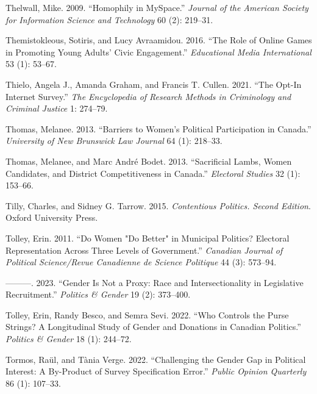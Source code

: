 \documentclass[
  letterpaper,
  DIV=11,
  numbers=noendperiod]{scrreprt}
\newlength{\cslhangindent}
\newlength{\cslentryspacingunit} %
\newenvironment{CSLReferences}[2] %
 {%
  \setlength{\parindent}{0pt}
  \ifodd #1
  \let\oldpar\par
  \def\par{\hangindent=\cslhangindent\oldpar}
  \fi
  \setlength{\parskip}{#2\cslentryspacingunit}
 }%
 {}
\begin{document}
\begin{CSLReferences}{1}{0}
\leavevmode{}%
Thelwall, Mike. 2009. {``{Homophily in MySpace}.''} \emph{Journal of the
American Society for Information Science and Technology} 60 (2):
219--31.

\leavevmode{}%
Themistokleous, Sotiris, and Lucy Avraamidou. 2016. {``{The Role of
Online Games in Promoting Young Adults' Civic Engagement}.''}
\emph{Educational Media International} 53 (1): 53--67.

\leavevmode{}%
Thielo, Angela J., Amanda Graham, and Francis T. Cullen. 2021. {``{The
Opt-In Internet Survey}.''} \emph{The Encyclopedia of Research Methods
in Criminology and Criminal Justice} 1: 274--79.

\leavevmode{}%
Thomas, Melanee. 2013. {``{Barriers to Women's Political Participation
in Canada}.''} \emph{University of New Brunswick Law Journal} 64 (1):
218--33.

\leavevmode{}%
Thomas, Melanee, and Marc André Bodet. 2013. {``{Sacrificial Lambs,
Women Candidates, and District Competitiveness in Canada}.''}
\emph{Electoral Studies} 32 (1): 153--66.

\leavevmode{}%
Tilly, Charles, and Sidney G. Tarrow. 2015. \emph{{Contentious Politics.
Second Edition}}. Oxford University Press.

\leavevmode{}%
Tolley, Erin. 2011. {``{Do Women "Do Better" in Municipal Politics?
Electoral Representation Across Three Levels of Government}.''}
\emph{Canadian Journal of Political Science/Revue Canadienne de Science
Politique} 44 (3): 573--94.

\leavevmode{}%
---------. 2023. {``{Gender Is Not a Proxy: Race and Intersectionality
in Legislative Recruitment}.''} \emph{Politics \& Gender} 19 (2):
373--400.

\leavevmode{}%
Tolley, Erin, Randy Besco, and Semra Sevi. 2022. {``{Who Controls the
Purse Strings? A Longitudinal Study of Gender and Donations in Canadian
Politics}.''} \emph{Politics \& Gender} 18 (1): 244--72.

\leavevmode{}%
Tormos, Raül, and Tània Verge. 2022. {``{Challenging the Gender Gap in
Political Interest: A By-Product of Survey Specification Error}.''}
\emph{Public Opinion Quarterly} 86 (1): 107--33.


\end{CSLReferences}
\end{document}
